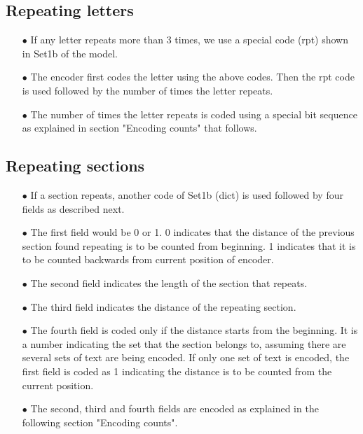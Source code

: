 \documentclass[]{article}
\begin{document}
\subsection{Repeating letters}
\begin{itemize}
	\item[$\bullet$] If any letter repeats more than 3 times, we use a special code (rpt) shown in Set1b of the model.
	\item[$\bullet$] The encoder first codes the letter using the above codes.  Then the rpt code is used followed by the number of times the letter repeats.
	\item[$\bullet$] The number of times the letter repeats is coded using a special bit sequence as explained in section "Encoding counts" that follows.
\end{itemize}

\subsection{Repeating sections}
\begin{itemize}
	\item[$\bullet$] If a section repeats, another code of Set1b (dict) is used followed by four fields as described next.
	\item[$\bullet$] The first field would be 0 or 1. 0 indicates that the distance of the previous section found repeating is to be counted from beginning. 1 indicates that it is to be counted backwards from current position of encoder.
	\item[$\bullet$] The second field indicates the length of the section that repeats.
	\item[$\bullet$] The third field indicates the distance of the repeating section.
	\item[$\bullet$] The fourth field is coded only if the distance starts from the beginning.  It is a number indicating the set that the section belongs to, assuming there are several sets of text are being encoded.  If only one set of text is encoded, the first field is coded as 1 indicating the distance is to be counted from the current position.
	\item[$\bullet$] The second, third and fourth fields are encoded as explained in the following section "Encoding counts".
\end{itemize}
\end{document}

